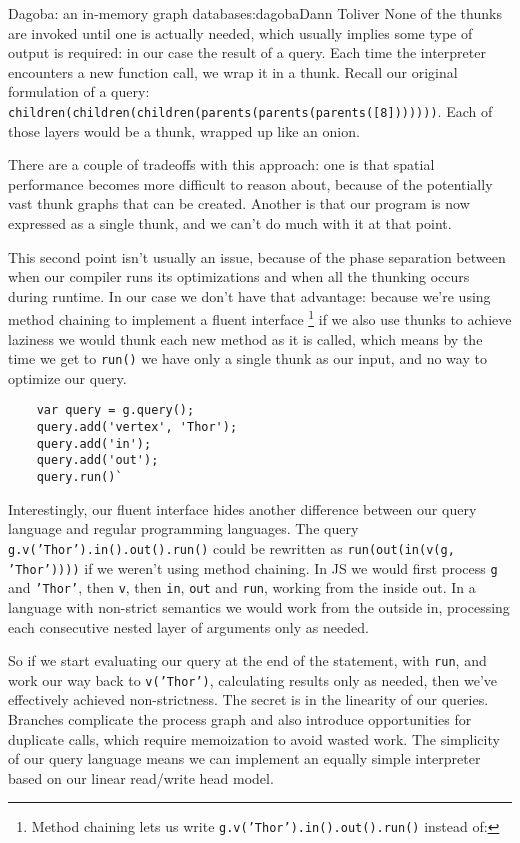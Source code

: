 \begin{aosachapter}{Dagoba: an in-memory graph database}{s:dagoba}{Dann Toliver}
None of the thunks are invoked until one is actually needed, which
usually implies some type of output is required: in our case the result
of a query. Each time the interpreter encounters a new function call, we
wrap it in a thunk. Recall our original formulation of a query:
\texttt{children(children(children(parents(parents(parents({[}8{]}))))))}.
Each of those layers would be a thunk, wrapped up like an onion.

There are a couple of tradeoffs with this approach: one is that spatial
performance becomes more difficult to reason about, because of the
potentially vast thunk graphs that can be created. Another is that our
program is now expressed as a single thunk, and we can't do much with it
at that point.

This second point isn't usually an issue, because of the phase
separation between when our compiler runs its optimizations and when all
the thunking occurs during runtime. In our case we don't have that
advantage: because we're using method chaining to implement a fluent
interface \footnote{Method chaining lets us write
  \texttt{g.v('Thor').in().out().run()} instead of:} if we also use
thunks to achieve laziness we would thunk each new method as it is
called, which means by the time we get to \texttt{run()} we have only a
single thunk as our input, and no way to optimize our query.

\begin{verbatim}
    var query = g.query(); 
    query.add('vertex', 'Thor'); 
    query.add('in'); 
    query.add('out'); 
    query.run()`
\end{verbatim}

Interestingly, our fluent interface hides another difference between our
query language and regular programming languages. The query
\texttt{g.v('Thor').in().out().run()} could be rewritten as
\texttt{run(out(in(v(g, 'Thor'))))} if we weren't using method chaining.
In JS we would first process \texttt{g} and \texttt{'Thor'}, then
\texttt{v}, then \texttt{in}, \texttt{out} and \texttt{run}, working
from the inside out. In a language with non-strict semantics we would
work from the outside in, processing each consecutive nested layer of
arguments only as needed.

So if we start evaluating our query at the end of the statement, with
\texttt{run}, and work our way back to \texttt{v('Thor')}, calculating
results only as needed, then we've effectively achieved non-strictness.
The secret is in the linearity of our queries. Branches complicate the
process graph and also introduce opportunities for duplicate calls,
which require memoization to avoid wasted work. The simplicity of our
query language means we can implement an equally simple interpreter
based on our linear read/write head model.


\end{aosachapter}
